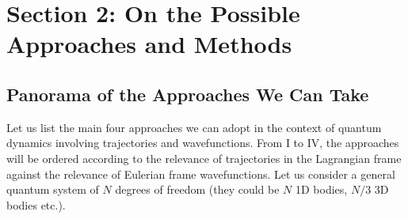\documentclass[11pt, a4paper]{article} %
\begin{document}
\section*{Section 2: On the Possible Approaches and Methods}
\subsection*{Panorama of the Approaches We Can Take }

Let us list the main four approaches we can adopt in the context of quantum dynamics involving trajectories and wavefunctions. From I to IV, the approaches will be ordered according to the relevance of trajectories in the Lagrangian frame against the relevance of Eulerian frame wavefunctions. Let us consider a general quantum system of $N$ degrees of freedom (they could be $N$ 1D bodies, $N/3$ 3D bodies etc.).
\end{document}
